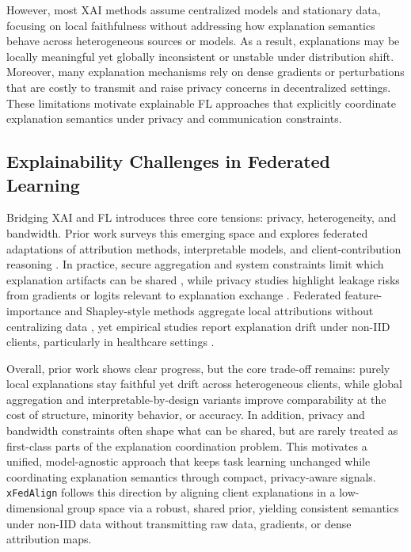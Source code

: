\documentclass{article}
\theoremstyle{plain}
\theoremstyle{definition}
\theoremstyle{remark}
\begin{document}
However, most XAI methods assume centralized models and stationary data, focusing on local faithfulness without addressing how explanation semantics behave across heterogeneous sources or models. As a result, explanations may be locally meaningful yet globally inconsistent or unstable under distribution shift. Moreover, many explanation mechanisms rely on dense gradients or perturbations that are costly to transmit and raise privacy concerns in decentralized settings. These limitations motivate explainable FL approaches that explicitly coordinate explanation semantics under privacy and communication constraints.


\subsection{Explainability Challenges in Federated Learning}

Bridging XAI and FL introduces three core tensions: privacy, heterogeneity, and bandwidth. Prior work surveys this emerging space and explores federated adaptations of attribution methods, interpretable models, and client-contribution reasoning \citep{chaddad2023explainable,li2023towards}. In practice, secure aggregation and system constraints limit which explanation artifacts can be shared \citep{bonawitz2019towards}, while privacy studies highlight leakage risks from gradients or logits relevant to explanation exchange \citep{melis2019exploiting,shokri2015privacy}. Federated feature-importance and Shapley-style methods aggregate local attributions without centralizing data \citep{wang2019measure,ghorbani2019data}, yet empirical studies report explanation drift under non-IID clients, particularly in healthcare settings \citep{rieke2020future,sheller2020federated}.

Overall, prior work shows clear progress, but the core trade-off remains: purely local explanations stay faithful yet drift across heterogeneous clients, while global aggregation and interpretable-by-design variants improve comparability at the cost of structure, minority behavior, or accuracy. In addition, privacy and bandwidth constraints often shape what can be shared, but are rarely treated as first-class parts of the explanation coordination problem. This motivates a unified, model-agnostic approach that keeps task learning unchanged while coordinating explanation semantics through compact, privacy-aware signals. \texttt{xFedAlign} follows this direction by aligning client explanations in a low-dimensional group space via a robust, shared prior, yielding consistent semantics under non-IID data without transmitting raw data, gradients, or dense attribution maps.
\end{document}
